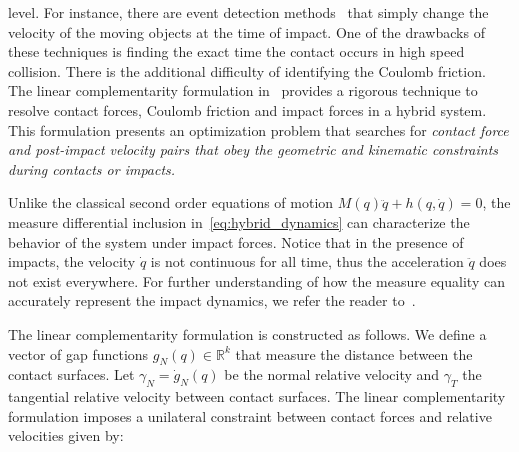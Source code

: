 level.
%
For instance, there are event detection methods~\cite{cellier1986combined} that
simply change the velocity of the moving objects at the time of impact.
%
One of the drawbacks of these techniques is finding the exact time the contact
occurs in high speed collision.
%
There is the additional difficulty of identifying the Coulomb friction.
%
The linear complementarity formulation in~\cite{glocker2005formulation} provides
a rigorous technique to resolve contact forces, Coulomb friction and impact
forces in a hybrid system.
%
This formulation presents an optimization problem that searches for \it{contact force
and post-impact velocity} \normalfont pairs that obey the geometric and
kinematic constraints during contacts or impacts.
%

\begin{rem}
  Unlike the classical second order equations of motion $M(q) \ddot{q} + h(q,
  \dot{q}) = 0$, the measure differential inclusion
  in~\eqref{eq:hybrid_dynamics} can characterize the behavior of the system
  under impact forces. Notice that in the presence of impacts, the velocity
  $\dot{q}$ is not continuous for all time, thus the acceleration $\ddot{q}$
  does not exist everywhere. For further understanding of how the measure
  equality can accurately represent the impact dynamics, we refer the reader
  to~\cite{moreau1988unilateral}.
\end{rem}
%
The linear complementarity formulation is constructed as follows. We define a
vector of gap functions $g_N(q) \in \mathbb{R}^{k}$ that measure the distance
between the contact surfaces. 
%
Let $\gamma_N = \dot{g}_N(q)$ be the normal relative velocity and
$\gamma_T$ the tangential relative velocity between contact surfaces.
%
The linear complementarity formulation imposes a unilateral constraint between
contact forces and relative velocities given by:

